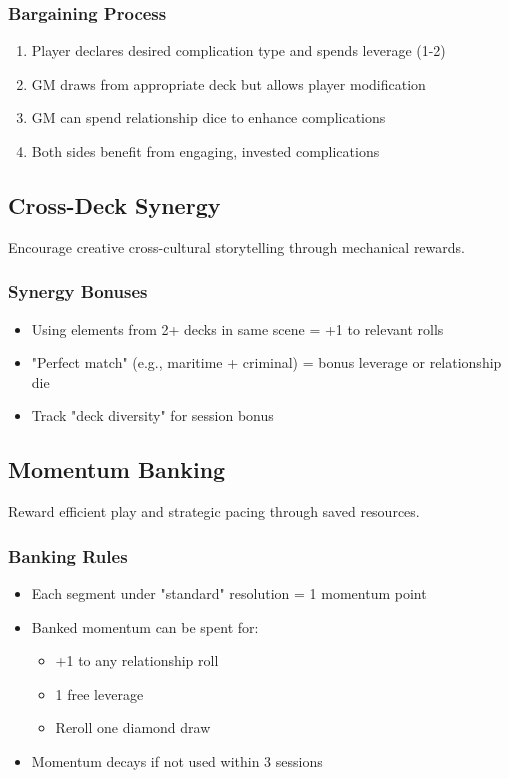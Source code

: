 \begin{description}
\begin{description}
\subsubsection{Bargaining Process}

\begin{enumerate}
\item Player declares desired complication type and spends leverage (1-2)
\item GM draws from appropriate deck but allows player modification
\item GM can spend relationship dice to enhance complications
\item Both sides benefit from engaging, invested complications
\end{enumerate}

\subsection{Cross-Deck Synergy}

Encourage creative cross-cultural storytelling through mechanical rewards.

\subsubsection{Synergy Bonuses}

\begin{itemize}
\item Using elements from 2+ decks in same scene = +1 to relevant rolls
\item "Perfect match" (e.g., maritime + criminal) = bonus leverage or relationship die
\item Track "deck diversity" for session bonus
\end{itemize}

\subsection{Momentum Banking}

Reward efficient play and strategic pacing through saved resources.

\subsubsection{Banking Rules}

\begin{itemize}
\item Each segment under "standard" resolution = 1 momentum point
\item Banked momentum can be spent for:
  \begin{itemize}
  \item +1 to any relationship roll
  \item 1 free leverage
  \item Reroll one diamond draw
  \end{itemize}
\item Momentum decays if not used within 3 sessions
\end{itemize}


\end{description}
\end{description}
